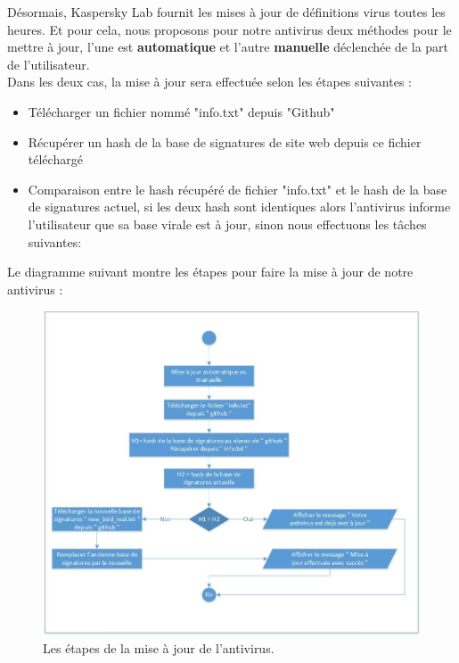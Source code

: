 Désormais, Kaspersky Lab fournit les mises à jour de définitions virus toutes les heures.
Et pour cela, nous proposons pour notre antivirus deux méthodes pour le mettre à jour, l'une est \textbf{automatique} et l'autre \textbf{manuelle} déclenchée de la part de l'utilisateur.\\


Dans les deux cas, la mise à jour sera effectuée selon les étapes suivantes :

\begin{itemize}
\item Télécharger un fichier nommé "info.txt" depuis "Github"
\item Récupérer un hash de la base de signatures de site web depuis ce fichier téléchargé 
\item Comparaison entre le hash récupéré de fichier "info.txt" et le hash de la base de signatures actuel, si les deux hash sont identiques alors l'antivirus informe l'utilisateur que sa base virale est à jour, sinon nous effectuons les tâches suivantes:

\end{itemize}

Le diagramme suivant montre les étapes pour faire la mise à jour de notre antivirus :
\begin{figure}[H]
\begin{center}
\includegraphics[scale=0.6]{Figures/mise.jpg}
\caption{Les étapes de la mise à jour de l'antivirus.}
\label{fig :scan} 
\end{center}
\end{figure}


